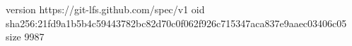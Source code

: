 version https://git-lfs.github.com/spec/v1
oid sha256:21fd9a1b5b4c59443782bc82d70c0f062f926c715347aca837e9aaec03406c05
size 9987
